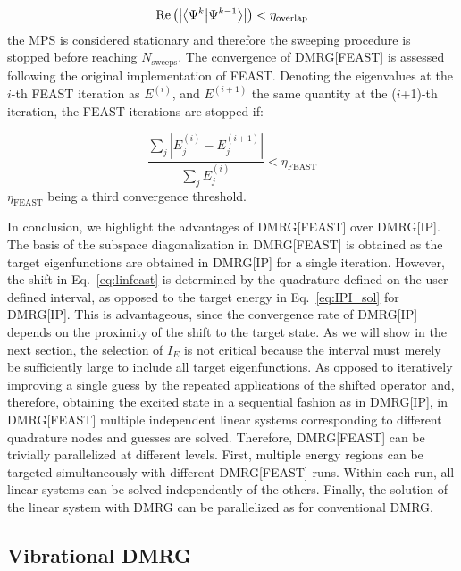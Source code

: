 \documentclass[journal=jctcce]{achemso}
\begin{document}
\begin{equation}
  \text{Re} \left( \abs{\bra{\Psi^k}\ket{\Psi^{k-1}}} \right) < \eta_\text{overlap}
  \label{eq:SecondConvergence}
\end{equation}
%
the MPS is considered stationary and therefore the sweeping procedure is stopped before reaching $N_\text{sweeps}$.
The convergence of DMRG[FEAST] is assessed following the original implementation of FEAST.\cite{Polizzi2009_FEAST}
Denoting the eigenvalues at the $i$-th FEAST iteration as $E^{(i)}$, and $E^{(i+1)}$ the same quantity at the ($i$+1)-th iteration, the FEAST iterations are stopped if:

\begin{equation}
 \frac{\sum_j \left| E_j^{(i)} - E_j^{(i+1)} \right|}{\sum_j E_j^{(i)}} < \eta_\text{FEAST}
  \label{eq:EigenvaluesRatio}
\end{equation}
%
$\eta_\text{FEAST}$ being a third convergence threshold.

\noindent In conclusion, we highlight the advantages of DMRG[FEAST] over DMRG[IP].
The basis of the subspace diagonalization in DMRG[FEAST] is obtained as the target eigenfunctions are obtained in DMRG[IP] for a single iteration.
However, the shift in Eq.~\eqref{eq:linfeast} is determined by the quadrature defined on the user-defined interval, as opposed to the target energy in Eq.~\eqref{eq:IPI_sol} for DMRG[IP].
This is advantageous, since the convergence rate of DMRG[IP] depends on the proximity of the shift to the target state.
As we will show in the next section, the selection of $I_E$ is not critical because the interval must merely be sufficiently large to include all target eigenfunctions.
As opposed to iteratively improving a single guess by the repeated applications of the shifted operator and, therefore, obtaining the excited state in a sequential fashion as in DMRG[IP], in DMRG[FEAST] multiple independent linear systems corresponding to different quadrature nodes and guesses are solved.
Therefore, DMRG[FEAST] can be trivially parallelized at different levels.
First, multiple energy regions can be targeted simultaneously with different DMRG[FEAST] runs.
Within each run, all linear systems can be solved independently of the others.
Finally, the solution of the linear system with DMRG can be parallelized as for conventional DMRG.\cite{Brabec2021_Parallel-DMRG}

\subsection{Vibrational DMRG}
\label{subsec:vDMRG}
\end{document}
